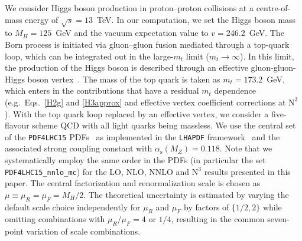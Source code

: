 \documentclass[12pt]{article}
\DeclareRobustCommand{\alphas}{\ensuremath{\alpha_{\mathrm{s}}}\xspace}
\DeclareRobustCommand{\as}{\alphas}
\DeclareRobustCommand{\LO}{\text{LO}\xspace}
\DeclareRobustCommand{\N}[1]{\ensuremath{\text{N}^{#1}}} %
\begin{document}
We consider Higgs boson production in proton--proton collisions at a centre-of-mass energy of $\sqrt{s}=13$~TeV. In our computation, we set the Higgs boson mass to $M_H= 125$~GeV and the vacuum expectation value to $v=246.2$~GeV. 
The Born process is initiated via gluon--gluon fusion mediated through a top-quark loop, which can be integrated out in the large-$m_t$ limit ($m_{t}\rightarrow \infty$).
In this limit, the production of the Higgs boson is described through an effective gluon-gluon-Higgs boson vertex~\cite{Heft}.
The mass of the top quark is taken as $m_t = 173.2$~GeV, which enters in the contributions that have a residual $m_t$ dependence (e.g.\ Eqs.~\eqref{H2g} and \eqref{H3approx} and effective vertex coefficient corrections at \N3\LO). 
With the top quark loop replaced by an effective vertex, we consider a five-flavour scheme QCD with all light quarks being massless. We use the central set of the \verb|PDF4LHC15| PDFs~\cite{nnpdf} as implemented in the \texttt{LHAPDF} framework~\cite{Buckley:2014ana} and the associated strong coupling constant with $\as(M_Z)=0.118$. Note that we systematically employ the same order in the PDFs (in particular the set \verb|PDF4LHC15_nnlo_mc|) for the LO, NLO, NNLO and \N3\LO results presented in this paper. The central factorization and renormalization scale is chosen as $\mu \equiv \mu_R = \mu_F =  M_H / 2$. The theoretical uncertainty is estimated by varying the default scale choice independently for $\mu_R$ and $\mu_F$ by factors of $\{1/2,2\}$ while omitting combinations with $\mu_R/\mu_F = 4$ or $1/4$, resulting in the common seven-point variation of scale combinations. 
\end{document}
